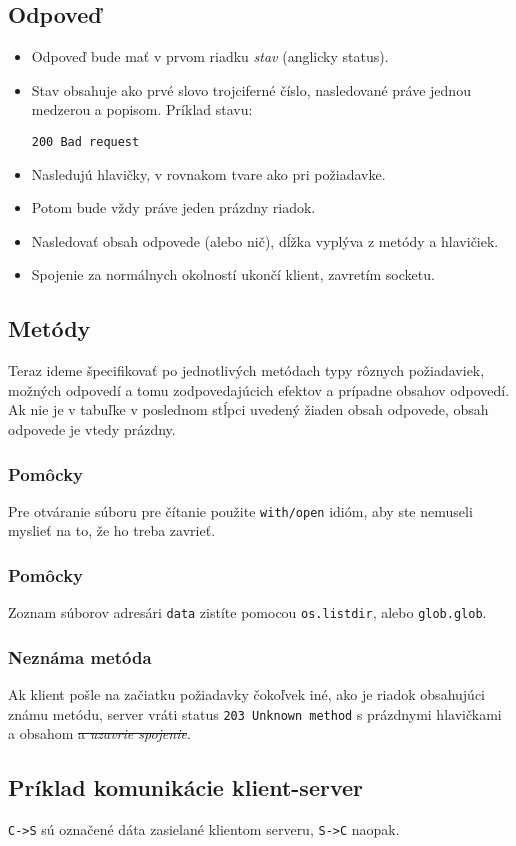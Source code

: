 \documentclass[11pt]{article}
\theoremstyle{definition}
\begin{document}
\subsection{Odpoveď}
\begin{itemize}
\item Odpoveď bude mať v prvom riadku \emph{stav} (anglicky status).
\item Stav obsahuje ako prvé slovo trojciferné číslo, nasledované práve jednou medzerou a popisom. Príklad stavu:
\begin{flushleft}
\texttt{200 Bad request}
\end{flushleft}
\item Nasledujú hlavičky, v rovnakom tvare ako pri požiadavke.
\item Potom bude vždy práve jeden prázdny riadok.
\item Nasledovať obsah odpovede (alebo nič), dĺžka vyplýva z metódy a hlavičiek.
\item Spojenie za normálnych okolností ukončí klient, zavretím socketu.
\end{itemize}
\subsection{Metódy}
Teraz ideme špecifikovať po jednotlivých metódach typy rôznych požiadaviek, možných odpovedí a tomu
zodpovedajúcich efektov a prípadne obsahov odpovedí.
Ak nie je v tabuľke v poslednom stĺpci uvedený žiaden obsah odpovede, obsah odpovede
je vtedy prázdny.

\subsubsection{Pomôcky}
Pre otváranie súboru pre čítanie použite \texttt{with/open} idióm,
aby ste nemuseli myslieť na to, že ho treba zavrieť.
\begin{framed}

\end{framed}

\subsubsection{Pomôcky}
Zoznam súborov adresári \texttt{data} zistíte pomocou \texttt{os.listdir}, alebo \texttt{glob.glob}.
\begin{framed}

\end{framed}

\subsubsection{Neznáma metóda}
Ak klient pošle na začiatku požiadavky čokoľvek iné, ako je
riadok obsahujúci známu metódu, server vráti status \texttt{203 Unknown method} s
prázdnymi hlavičkami a obsahom \sout{a {\em uzavrie spojenie}}.
\newpage
\subsection{Príklad komunikácie klient-server}
\texttt{C->S} sú označené dáta zasielané klientom serveru, \texttt{S->C} naopak.
\small

\end{document}
